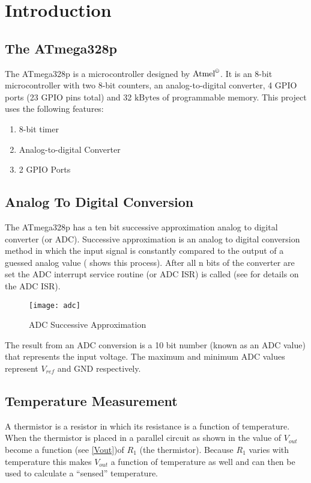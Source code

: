 \documentclass[main.tex]{subfiles}
\begin{document}
\chapter{Introduction}
	\section{The ATmega328p}

	The ATmega328p is a microcontroller designed by $\mathrm{Atmel}^{\copyright}$.
	It is an 8-bit microcontroller with two 8-bit counters, an analog-to-digital
	converter, 4 GPIO ports (23 GPIO pins total) and 32 $\mathrm{kBytes}$ of
	programmable memory. This project uses the following features:

		\begin{enumerate}
			\item 8-bit timer
			\item Analog-to-digital Converter
			\item 2 GPIO Ports 
		\end{enumerate}

	\section{Analog To Digital Conversion}\label{sec:ADC}
	The ATmega328p has a ten bit successive approximation analog to digital
	converter (or ADC). Successive approximation is an analog to digital
	conversion method in which the input signal is constantly compared to the
	output of a guessed analog value ( shows this process). After
	all n bits of the converter are set the ADC interrupt service routine (or ADC
	ISR) is called (see  for details on the ADC ISR). 

	\begin{figure}[H]
		\begin{center}
			\texttt{[image: adc]}
		\end{center}
		\caption{ADC Successive Approximation}
		\label{fig:adcSA}
	\end{figure}

	The result from an ADC conversion is a 10 bit number (known as an ADC value)
	that represents the input voltage. The maximum and minimum ADC values
	represent $V_{ref}$ and $\mathrm{GND}$ respectively.
		
	\section{Temperature Measurement}
	A thermistor is a resistor in which its resistance is a function of
	temperature. When the thermistor is placed in a parallel circuit as shown in
	 the value of $V_{out}$ become a function (see
	\eqref{Vout})of $R_{1}$ (the thermistor). Because $R_{1}$ varies with
	temperature this makes $V_{out}$ a function of temperature as well and can
	then be used to calculate a ``sensed'' temperature.
	
\end{document}
